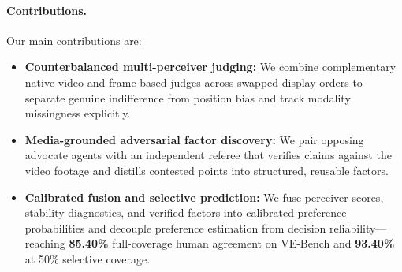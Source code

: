 \paragraph{Contributions.}
Our main contributions are:
\begin{itemize}[leftmargin=*, topsep=2pt, itemsep=1pt]
  \item \textbf{Counterbalanced multi-perceiver judging:} We combine complementary native-video and frame-based judges across swapped display orders to separate genuine indifference from position bias and track modality missingness explicitly.
  \item \textbf{Media-grounded adversarial factor discovery:} We pair opposing advocate agents with an independent referee that verifies claims against the video footage and distills contested points into structured, reusable factors.
  \item \textbf{Calibrated fusion and selective prediction:} We fuse perceiver scores, stability diagnostics, and verified factors into calibrated preference probabilities and decouple preference estimation from decision reliability---reaching \textbf{85.40\%} full-coverage human agreement on VE-Bench and \textbf{93.40\%} at 50\% selective coverage.
\end{itemize}
